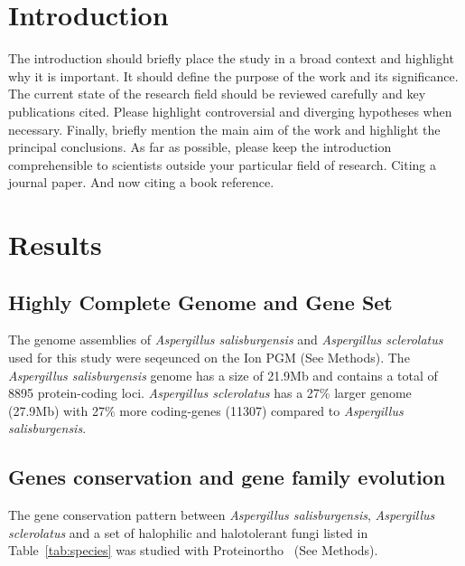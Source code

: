 \documentclass[jof,article,submit,moreauthors,pdftex,10pt,a4paper]{Definitions/mdpi}
\newcommand{\phiSp}{\textit{Aspergillus salisburgensis}}
\newcommand{\phiScl}{\textit{Aspergillus sclerolatus}}
\begin{document}



\section{Introduction}
The introduction should briefly place the study in a broad context and highlight why it is important. It should define the purpose of the work and its significance. The current state of the research field should be reviewed carefully and key publications cited. Please highlight controversial and diverging hypotheses when necessary. Finally, briefly mention the main aim of the work and highlight the principal conclusions. As far as possible, please keep the introduction comprehensible to scientists outside your particular field of research. Citing a journal paper. And now citing a book reference.
\section{Results}
\subsection{Highly Complete Genome and Gene Set}
The genome assemblies of {\phiSp} and {\phiScl} used for this study
were seqeunced on the Ion PGM (See Methods). The {\phiSp} genome has a
size of 21.9Mb and contains a total of 8895 protein-coding
loci. {\phiScl} has a 27$\%$ larger genome (27.9Mb) with 27$\%$ more
coding-genes (11307) compared to {\phiSp}.
\subsection{Genes conservation and gene family evolution}
The gene conservation pattern between {\phiSp}, {\phiScl} and a set of
halophilic and halotolerant fungi listed in Table~\ref{tab:species}
was studied with Proteinortho~\cite{Lechner2011} (See Methods). 
\end{document}
